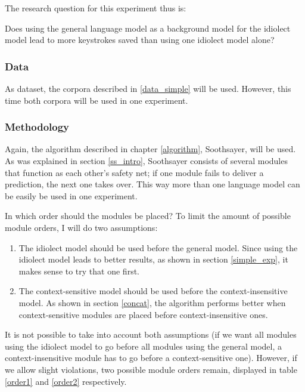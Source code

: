 \documentclass[12pt]{article}
\begin{document}
The research question for this experiment thus is:

\begin{examples}

\item Does using the general language model as a background model for the idiolect model lead to more keystrokes saved than using one idiolect model alone?

\end{examples}

\subsubsection{Data}
As dataset, the corpora described in \ref{data_simple} will be used. However, this time  both corpora will be used in one experiment.

\subsubsection{Methodology}
Again, the algorithm described in chapter \ref{algorithm}, Soothsayer, will be used. As was explained in section \ref{ss_intro}, Soothsayer consists of several modules that function as each other's safety net; if one module fails to deliver a prediction, the next one takes over. This way more than one language model can be easily be used in one experiment.

In which order should the modules be placed? To limit the amount of possible module orders, I will do two assumptions:

\begin{enumerate}

\item The idiolect model should be used before the general model. Since using the idiolect model leads to better results, as shown in section \ref{simple_exp}, it makes sense to try that one first.
\item The context-sensitive model should be used before the context-insensitive model. As shown in section \ref{concat}, the algorithm performs better when context-sensitive modules are placed before context-insensitive ones.

\end{enumerate}

It is not possible to take into account both assumptions (if we want all modules using the idiolect model to go before all modules using the general model, a context-insensitive module has to go before a context-sensitive one). However, if we allow slight violations, two possible module orders remain, displayed in table \ref{order1} and \ref{order2} respectively. 
\end{document}
